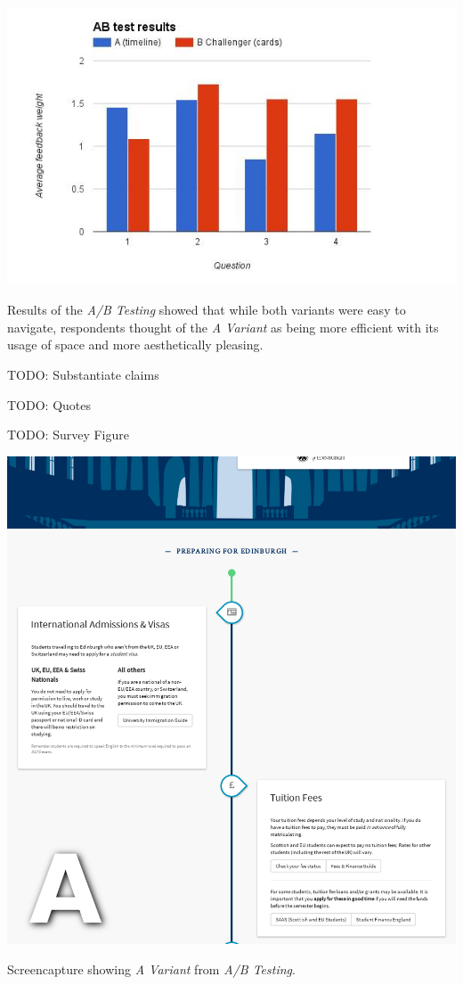 \documentclass[a4paper, notoc]{tufte-handout}
\begin{document}
\begin{marginfigure}
  \includegraphics[width=\linewidth]{abresults.png}
  \caption{
    \label{fig:abresults}
    Results of the \textit{A/B Testing} showed that while both variants were easy to navigate, respondents thought of the \textit{A Variant} as being more efficient with its usage of space and more aesthetically pleasing.
  }
\end{marginfigure}

TODO: Substantiate claims

TODO: Quotes

TODO: Survey Figure

\begin{marginfigure}
  \includegraphics[width=\linewidth]{avariant.png}
  \caption{
    \label{fig:avariant}
    Screencapture showing \textit{A Variant} from \textit{A/B Testing}.
  }

\end{marginfigure}
\end{document}
